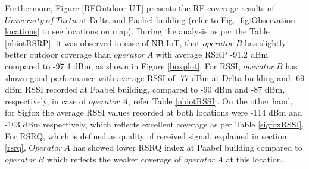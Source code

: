 \documentclass[12pt]{article}
\begin{document}
Furthermore, Figure \ref{RFOutdoor UT} presents the RF coverage results of $University\ of\  Tartu$ at Delta and Paabel building (refer to Fig. \ref{fig:Observation locations} to see locations on map). During the analysis as per the Table \ref{nbiotRSRP}, it was observed in case of NB-IoT, that $operator\ B$ has slightly better outdoor coverage than $operator\ A $ with average RSRP -91.2 dBm compared to -97.4 dBm, as shown in Figure \ref{boxplot}. For RSSI, $operator\ B$ has shown good performance with average RSSI of -77 dBm at Delta building and -69 dBm RSSI recorded at Paabel building, compared to -90 dBm and -87 dBm, respectively, in case of $operator\ A$, refer Table \ref{nbiotRSSI}. On the other hand, for Sigfox the average RSSI values recorded at both locations were -114 dBm and -103 dBm respectively, which reflects excellent coverage as per Table \ref{sigfoxRSSI}. For RSRQ, which is defined as quality of received signal, explained in section \ref{rsrq}, $Operator\ A$ has showed lower RSRQ index at Paabel building compared to $operator\ B$ which reflects the weaker coverage of $operator\ A$ at this location.\par



\end{document}
